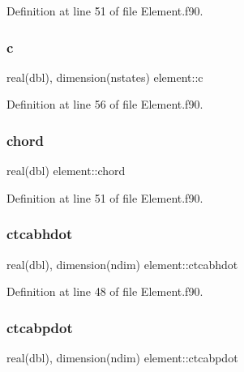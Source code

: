 Definition at line 51 of file Element.\+f90.

\mbox{\label{namespaceelement_a1203577a202409830d687bf3b68c621e}} 
\subsubsection{\texorpdfstring{c}{c}}
{\footnotesize\ttfamily real(dbl), dimension(nstates) element\+::c\hspace{0.3cm}{\ttfamily [private]}}



Definition at line 56 of file Element.\+f90.

\mbox{\label{namespaceelement_a55d26e2f0da1242eeb9cc8d3d589f1e5}} 
\subsubsection{\texorpdfstring{chord}{chord}}
{\footnotesize\ttfamily real(dbl) element\+::chord\hspace{0.3cm}{\ttfamily [private]}}



Definition at line 51 of file Element.\+f90.

\mbox{\label{namespaceelement_a4afdc10a9e39215ab6c7d03fe10a4473}} 
\subsubsection{\texorpdfstring{ctcabhdot}{ctcabhdot}}
{\footnotesize\ttfamily real(dbl), dimension(ndim) element\+::ctcabhdot\hspace{0.3cm}{\ttfamily [private]}}



Definition at line 48 of file Element.\+f90.

\mbox{\label{namespaceelement_a8dd69dbb67c325d43811863c2f95e9e0}} 
\subsubsection{\texorpdfstring{ctcabpdot}{ctcabpdot}}
{\footnotesize\ttfamily real(dbl), dimension(ndim) element\+::ctcabpdot\hspace{0.3cm}{\ttfamily [private]}}



